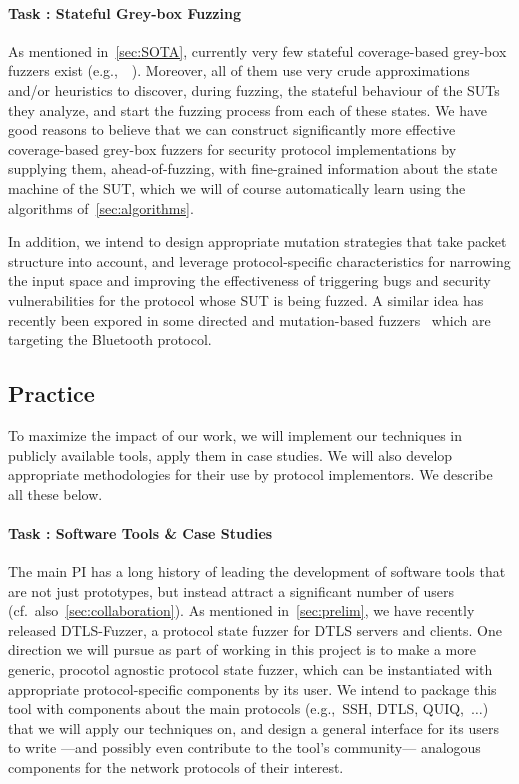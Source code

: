 \documentclass[11pt]{article}
\newcommand{\system}[1]{\mbox{\textsf{#1}}}
\newcounter{Task}
\newcommand{\task}[1]{\addtocounter{Task}{1}\paragraph{Task \theTask: #1}}
\newcommand{\significance}[1]{\vspace*{-0.5em}%
  \begin{quoting}\noindent\textbf{Significance:} #1\end{quoting}}
\newcommand{\myparagraph}{}
\let\myparagraph=\paragraph
\renewcommand{\paragraph}{\vspace{-3mm}\myparagraph}
\newcommand{\eg}{e.\/g.,\ }
\begin{document}

\task{Stateful Grey-box Fuzzing}
As mentioned in~\cref{sec:SOTA}, currently very few stateful coverage-based
grey-box fuzzers exist (\eg~\cite{AFLNET@ICST-20,StateAFL@ESE-22}). Moreover,
all of them use very crude approximations and/or heuristics to discover,
during fuzzing, the stateful behaviour of the SUTs they analyze, and start the
fuzzing process from each of these states. We have good reasons to believe
that we can construct significantly more effective coverage-based grey-box
fuzzers for security protocol implementations by supplying them,
ahead-of-fuzzing, with fine-grained information about the state machine of the
SUT, which we will of course automatically learn using the algorithms
of~\cref{sec:algorithms}.

In addition, we intend to design appropriate mutation strategies that take
packet structure into account, and leverage protocol-specific characteristics
for narrowing the input space and improving the effectiveness of triggering
bugs and security vulnerabilities for the protocol whose SUT is being fuzzed.
A similar idea has recently been expored in some directed and mutation-based
fuzzers~\cite{Frankenstein@USENIX-20,SweynTooth@ATC-20,Braktooth@USENIX-22}
which are targeting the Bluetooth protocol.


\subsection{Practice}
To maximize the impact of our work, we will implement our techniques in
publicly available tools, apply them in case studies. We will also develop
appropriate methodologies for their use by protocol implementors. We describe
all these below.

\task{Software Tools \& Case Studies}
The main PI has a long history of leading the development of software tools
that are not just prototypes, but instead attract a significant number of
users (cf.\ also~\cref{sec:collaboration}).
%
As mentioned in~\cref{sec:prelim}, we have recently released
\system{DTLS-Fuzzer}, a protocol state fuzzer for DTLS servers and clients.
One direction we will pursue as part of working in this project is to make a
more generic, procotol agnostic protocol state fuzzer, which can be
instantiated with appropriate protocol-specific components by its user.  We
intend to package this tool with components about the main protocols (\eg SSH,
DTLS, QUIQ,~$\ldots$) that we will apply our techniques on, and design a
general interface for its users to write ---and possibly even contribute to
the tool's community--- analogous components for the network protocols of
their interest.
\end{document}
